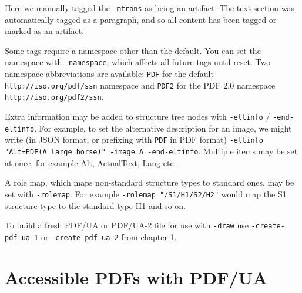 \documentclass{book}
\begin{document}
\noindent Here we manually tagged the \texttt{-mtrans} as being an artifact. The text section was automatically tagged as a paragraph, and so all content has been tagged or marked as an artifact.

Some tags require a namespace other than the default. You can set the namespace with \texttt{-namespace}, which affects all future tags until reset. Two namespace abbreviations are available: \texttt{PDF} for the default \texttt{http://iso.org/pdf/ssn} namespace and \texttt{PDF2} for the PDF 2.0 namespace \texttt{http://iso.org/pdf2/ssn}.

Extra information may be added to structure tree nodes with \texttt{-eltinfo} / \texttt{-end-eltinfo}. For example, to set the alternative description for an image, we might write (in JSON format, or prefixing with \texttt{PDF} in PDF format) \texttt{-eltinfo "Alt=PDF(A large horse)" -image A -end-eltinfo}. Multiple items may be set at once, for example Alt, ActualText, Lang etc. 

A role map, which maps non-standard structure types to standard ones, may be set with \texttt{-rolemap}. For example \texttt{-rolemap "/S1/H1/S2/H2"} would map the S1 structure type to the standard type H1 and so on.

To build a fresh PDF/UA or PDF/UA-2 file for use with \texttt{-draw} use \texttt{-create-pdf-ua-1} or \texttt{-create-pdf-ua-2} from chapter \ref{chap:19}.

\clearpage\pagestyle{empty}
\chapter{Accessible PDFs with PDF/UA}\label{chap:19}\pagestyle{fancy}
\end{document}

